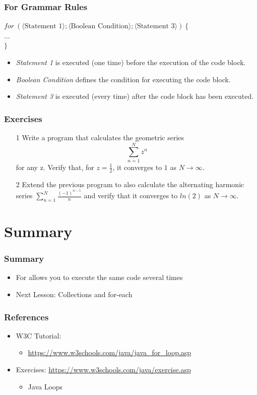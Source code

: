 \documentclass{beamer}
\newcommand{\cindent}{\hskip20pt}
\begin{document}
	\begin{frame}
		\frametitle{For Grammar Rules}
		$for\ (\langle \text{Statement 1} \rangle; \langle \text{Boolean Condition} \rangle; \langle \text{Statement 3} \rangle)\ \{$\\
			\cindent $...$\\
		$\}$\\
		\begin{itemize}
			\item \emph{Statement 1} is executed (one time) before the execution of the code block.
			\item \emph{Boolean Condition} defines the condition for executing the code block.
			\item \emph{Statement 3} is executed (every time) after the code block has been executed.
		\end{itemize}
	\end{frame}

	\begin{frame}
		\frametitle{Exercises}
		\begin{enumerate}
			\item[1] Write a program that calculates the geometric series \[\sum_{n=1}^{N}{z^n}\] for any z. Verify that, for $z=\frac{1}{2}$, it converges to $1$ as $N \to \infty$.
			\pause
			\item[2] Extend the previous program to also calculate the alternating harmonic series $ \sum_{n=1}^{N}{\frac{(-1)^{n-1}}{n}}$ and verify that it converges to $ln(2)$ as $N \to \infty$.
		\end{enumerate}
	\end{frame}

	\section{Summary}
	
	\begin{frame}
		\frametitle{Summary}
		\begin{itemize}
			\item For allows you to execute the same code several times
			\item Next Lesson: Collections and for-each
		\end{itemize}
	\end{frame}

	\begin{frame}
		\frametitle{References}
		\begin{itemize}
			\item W3C Tutorial: 
			\begin{itemize}
				\item \url{https://www.w3schools.com/java/java_for_loop.asp}
			\end{itemize}
			\item Exercises: \url{https://www.w3schools.com/java/exercise.asp}
			\begin{itemize}
				\item Java Loops
			\end{itemize}
		\end{itemize}
		
	\end{frame}
\end{document}
